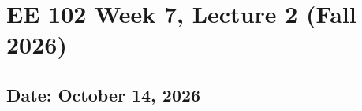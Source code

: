 \documentclass{ee102_notes}
\renewcommand{\releasedate}{October 14, 2026}
\begin{document}
\section*{EE 102 Week 7, Lecture 2 (Fall 2026)}
\subsection*{Date: \releasedate}
\tableofcontents

\end{document}
